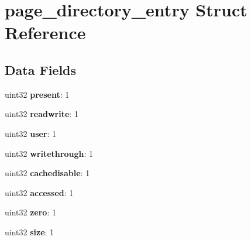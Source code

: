 \hypertarget{structpage__directory__entry}{
\section{page\_\-directory\_\-entry Struct Reference}
\label{structpage__directory__entry}
}
\subsection*{Data Fields}
\begin{DoxyCompactItemize}
\item 
\hypertarget{structpage__directory__entry_a992c7fd50e297e7672dbdf97ed43feaf}{
uint32 {\bfseries present}: 1}
\label{structpage__directory__entry_a992c7fd50e297e7672dbdf97ed43feaf}

\item 
\hypertarget{structpage__directory__entry_a22bc8cfa9b85ba57f72e9dfa49673bb8}{
uint32 {\bfseries readwrite}: 1}
\label{structpage__directory__entry_a22bc8cfa9b85ba57f72e9dfa49673bb8}

\item 
\hypertarget{structpage__directory__entry_a0e3125ebb8cdf37e73ad06a484980cd4}{
uint32 {\bfseries user}: 1}
\label{structpage__directory__entry_a0e3125ebb8cdf37e73ad06a484980cd4}

\item 
\hypertarget{structpage__directory__entry_ab2f995405cfe3bf42aa24b9cdf302531}{
uint32 {\bfseries writethrough}: 1}
\label{structpage__directory__entry_ab2f995405cfe3bf42aa24b9cdf302531}

\item 
\hypertarget{structpage__directory__entry_a6a95615b1a2edd3002bcdf58125d1bdd}{
uint32 {\bfseries cachedisable}: 1}
\label{structpage__directory__entry_a6a95615b1a2edd3002bcdf58125d1bdd}

\item 
\hypertarget{structpage__directory__entry_a54a3447801c534e994b99febcd5ac255}{
uint32 {\bfseries accessed}: 1}
\label{structpage__directory__entry_a54a3447801c534e994b99febcd5ac255}

\item 
\hypertarget{structpage__directory__entry_a0bbf065e3cd5e47ff11cd667fbeb930d}{
uint32 {\bfseries zero}: 1}
\label{structpage__directory__entry_a0bbf065e3cd5e47ff11cd667fbeb930d}

\item 
\hypertarget{structpage__directory__entry_ab47a059f3d7ab44018fec94509c14c8c}{
uint32 {\bfseries size}: 1}
\label{structpage__directory__entry_ab47a059f3d7ab44018fec94509c14c8c}


\end{DoxyCompactItemize}

